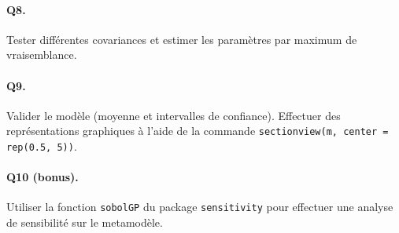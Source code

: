 \documentclass[12pt]{scrartcl}
\begin{document}
\paragraph{Q8.} Tester différentes covariances et estimer les paramètres par maximum de vraisemblance.

\paragraph{Q9. } Valider le modèle (moyenne et intervalles de confiance). Effectuer des représentations graphiques à l'aide de la commande \texttt{sectionview(m, center = rep(0.5, 5))}. 

\paragraph{Q10 (bonus).} Utiliser la fonction \texttt{sobolGP} du package \texttt{sensitivity} pour effectuer une analyse de sensibilité sur le metamodèle.
\end{document}
